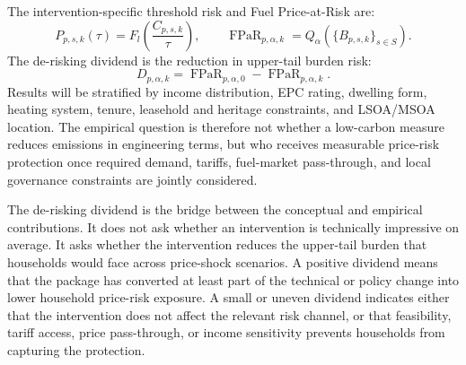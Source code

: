 The intervention-specific threshold risk and Fuel Price-at-Risk are:
\begin{equation}
P_{p,s,k}(\tau)=F_l\left(\frac{C_{p,s,k}}{\tau}\right),
\qquad
\operatorname{FPaR}_{p,\alpha,k}
=Q_{\alpha}\left(\{B_{p,s,k}\}_{s \in S}\right).
\end{equation}
The de-risking dividend is the reduction in upper-tail burden risk:
\begin{equation}
D_{p,\alpha,k}=
\operatorname{FPaR}_{p,\alpha,0}
-
\operatorname{FPaR}_{p,\alpha,k}.
\end{equation}
Results will be stratified by income distribution, EPC rating, dwelling form, heating system, tenure, leasehold and heritage constraints, and LSOA/MSOA location. The empirical question is therefore not whether a low-carbon measure reduces emissions in engineering terms, but who receives measurable price-risk protection once required demand, tariffs, fuel-market pass-through, and local governance constraints are jointly considered.

The de-risking dividend is the bridge between the conceptual and empirical contributions. It does not ask whether an intervention is technically impressive on average. It asks whether the intervention reduces the upper-tail burden that households would face across price-shock scenarios. A positive dividend means that the package has converted at least part of the technical or policy change into lower household price-risk exposure. A small or uneven dividend indicates either that the intervention does not affect the relevant risk channel, or that feasibility, tariff access, price pass-through, or income sensitivity prevents households from capturing the protection.
